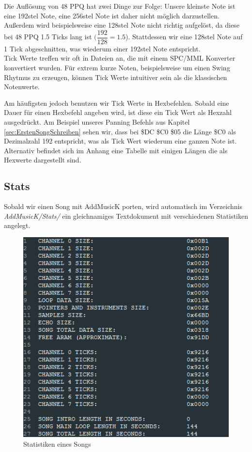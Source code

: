 \bigskip

Die Auflösung von 48 PPQ hat zwei Dinge zur Folge: Unsere kleinste Note ist eine 192stel Note, eine 256stel Note ist daher nicht möglich darzustellen. Außerdem wird beispielsweise eine 128stel Note nicht richtig aufgelöst, da diese bei 48 PPQ 1.5 Ticks lang ist $(\dfrac{192}{128} = 1.5$). Stattdessen wir eine 128stel Note auf 1 Tick abgeschnitten, was wiederum einer 192stel Note entspricht. \\
Tick Werte treffen wir oft in Dateien an, die mit einem SPC/MML Konverter konvertiert wurden. Für extrem kurze Noten, beispielsweise um einen Swing Rhytmus zu erzeugen, können Tick Werte intuitiver sein als die klassischen Notenwerte.

\bigskip

Am häufigsten jedoch benutzen wir Tick Werte in Hexbefehlen. Sobald eine Dauer für einen Hexbefehl angeben wird, ist diese ein Tick Wert als Hexzahl ausgedrückt. Am Beispiel unseres Panning Befehls aus Kapitel \ref{sec:ErstenSongSchreiben} sehen wir, dass bei \$DC \$C0 \$05 die Länge \$C0 als Dezimalzahl 192 entspricht, was als Tick Wert wiederum eine ganzen Note ist. \\
Alternativ befindet sich im Anhang eine Tabelle mit einigen Längen die als Hexwerte dargestellt sind.

\subsection{Stats}

Sobald wir einen Song mit AddMusicK porten, wird automatisch im Verzeichnis \textit{AddMusicK/Stats/} ein gleichnamiges Textdokument mit verschiedenen Statistiken angelegt.

\bigskip

\begin{figure}[htbp] \centering
	\includegraphics[width=.80\linewidth]{images/stats.png}
	\caption{Statistiken eines Songs}
	\label{stats}
\end{figure}

